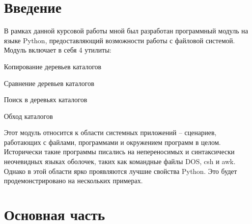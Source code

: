 \documentclass[12pt]{article}
\begin{document}
\pagestyle{plain}
\tableofcontents
\newpage
\section{Введение}
В рамках данной курсовой работы мной был разработан программный модуль на языке Python, предоставляющий возможности работы с файловой системой. Модуль включает в себя 4 утилиты:
\begin{list}{-}{}
\item Копирование деревьев каталогов
\item Сравнение деревьев каталогов
\item Поиск в деревьях каталогов
\item Обход каталогов
\end{list}
 Этот модуль относится к области системных приложений – сценариев, работающих с файлами, программами и окружением
программ в целом.
Исторически такие программы писались на непереносимых и синтаксически неочевидных
языках оболочек, таких как командные файлы DOS, csh и awk.
Однако в этой области ярко проявляются лучшие свойства Python. Это будет продемонстрировано на нескольких примерах.
\section{Основная часть}
\end{document}
